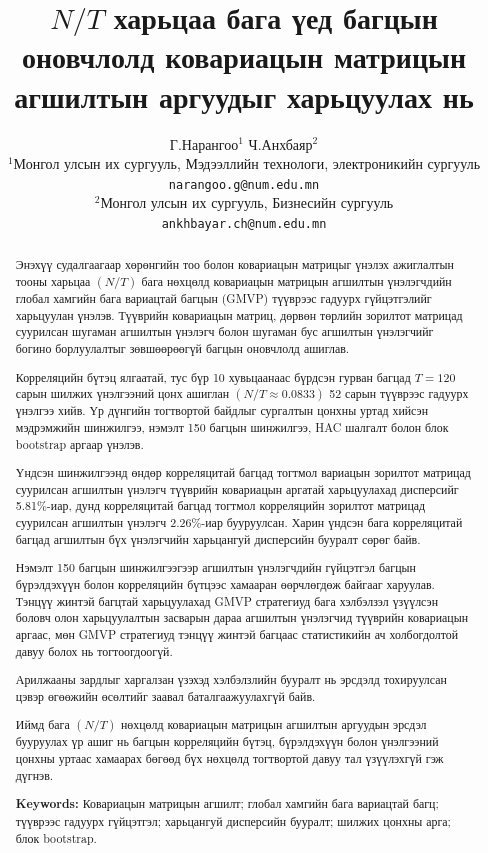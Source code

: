 \documentclass[11pt,a4paper]{article}
\title{
	\textbf{$N/T$ харьцаа бага үед багцын оновчлолд ковариацын матрицын агшилтын аргуудыг харьцуулах нь}
}
\author{
	Г.Нарангоо$^{1}$ \qquad Ч.Анхбаяр$^{2}$\\
	\small $^{1}$Монгол улсын их сургууль, Мэдээллийн технологи, электроникийн сургууль\\
	\small \texttt{narangoo.g@num.edu.mn}\\
	\small $^{2}$Монгол улсын их сургууль, Бизнесийн сургууль\\
	\small \texttt{ankhbayar.ch@num.edu.mn}
}
\date{}
\begin{document}
	
	\maketitle
		
		\begin{abstract}
			
			Энэхүү судалгаагаар хөрөнгийн тоо болон ковариацын
			матрицыг үнэлэх ажиглалтын тооны харьцаа $(N/T)$
			бага нөхцөлд ковариацын матрицын агшилтын
			үнэлэгчдийн глобал хамгийн бага вариацтай
			багцын (GMVP) түүврээс гадуурх гүйцэтгэлийг
			харьцуулан үнэлэв. Түүврийн ковариацын матриц,
			дөрвөн төрлийн зорилтот матрицад суурилсан
			шугаман агшилтын үнэлэгч болон шугаман бус
			агшилтын үнэлэгчийг богино борлуулалтыг
			зөвшөөрөөгүй багцын оновчлолд ашиглав.
			
			Корреляцийн бүтэц ялгаатай, тус бүр 10
			хувьцаанаас бүрдсэн гурван багцад
			$T=120$ сарын шилжих үнэлгээний цонх
			ашиглан $(N/T\approx0.0833)$
			52 сарын түүврээс гадуурх үнэлгээ хийв.
			Үр дүнгийн тогтвортой байдлыг сургалтын
			цонхны уртад хийсэн мэдрэмжийн шинжилгээ,
			нэмэлт 150 багцын шинжилгээ, HAC шалгалт
			болон блок bootstrap аргаар үнэлэв.
			
			Үндсэн шинжилгээнд өндөр корреляцитай
			багцад тогтмол вариацын зорилтот
			матрицад суурилсан агшилтын үнэлэгч
			түүврийн ковариацын аргатай харьцуулахад
			дисперсийг 5.81\%-иар, дунд корреляцитай
			багцад тогтмол корреляцийн зорилтот
			матрицад суурилсан агшилтын үнэлэгч
			2.26\%-иар бууруулсан. Харин үндсэн
			бага корреляцитай багцад агшилтын бүх
			үнэлэгчийн харьцангуй дисперсийн
			бууралт сөрөг байв.
			
			Нэмэлт 150 багцын шинжилгээгээр
			агшилтын үнэлэгчдийн гүйцэтгэл
			багцын бүрэлдэхүүн болон корреляцийн
			бүтцээс хамааран өөрчлөгдөж байгааг
			харуулав. Тэнцүү жинтэй багцтай
			харьцуулахад GMVP стратегиуд
			бага хэлбэлзэл үзүүлсэн боловч
			олон харьцуулалтын засварын дараа
			агшилтын үнэлэгчид түүврийн
			ковариацын аргаас, мөн GMVP
			стратегиуд тэнцүү жинтэй багцаас
			статистикийн ач холбогдолтой
			давуу болох нь тогтоогдоогүй.
			
			Арилжааны зардлыг харгалзан үзэхэд
			хэлбэлзлийн бууралт нь эрсдэлд
			тохируулсан цэвэр өгөөжийн өсөлтийг
			заавал баталгаажуулахгүй байв.
			
			Иймд бага $(N/T)$ нөхцөлд
			ковариацын матрицын агшилтын
			аргуудын эрсдэл бууруулах үр ашиг
			нь багцын корреляцийн бүтэц,
			бүрэлдэхүүн болон үнэлгээний
			цонхны уртаас хамаарах бөгөөд
			бүх нөхцөлд тогтвортой давуу
			тал үзүүлэхгүй гэж дүгнэв.
			
			\medskip
			
			\noindent
			\textbf{Keywords:}
			Ковариацын матрицын агшилт;
			глобал хамгийн бага вариацтай багц;
			түүврээс гадуурх гүйцэтгэл;
			харьцангуй дисперсийн бууралт;
			шилжих цонхны арга;
			блок bootstrap.
			
		\end{abstract}

	

	

%


%





	
\end{document}
